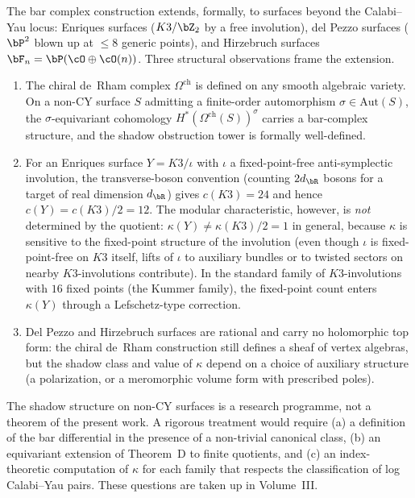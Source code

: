 \begin{remark}
\label{rem:enriques-exotic-shadows}
The bar complex
construction extends, formally, to surfaces beyond the
Calabi--Yau locus: Enriques surfaces ($K3/\bZ_2$ by a
free involution), del Pezzo surfaces ($\bP^2$ blown up at
$\leq 8$ generic points), and Hirzebruch surfaces
$\bF_n = \bP(\cO \oplus \cO(n))$. Three structural
observations frame the extension.
\begin{enumerate}[label=\textup{(\roman*)}]
\item The chiral de~Rham complex $\Omega^{\mathrm{ch}}$
 is defined on any smooth algebraic variety. On a non-CY
 surface $S$ admitting a finite-order automorphism
 $\sigma \in \mathrm{Aut}(S)$, the $\sigma$-equivariant
 cohomology $H^*(\Omega^{\mathrm{ch}}(S))^\sigma$ carries
 a bar-complex structure, and the shadow obstruction
 tower is formally well-defined.
\item For an Enriques surface $Y = K3/\iota$ with $\iota$ a
 fixed-point-free anti-symplectic involution, the
 transverse-boson convention (counting $2d_\bR$ bosons for
 a target of real dimension $d_\bR$) gives
 $c(K3) = 24$ and hence $c(Y) = c(K3)/2 = 12$. The
 modular characteristic, however, is \emph{not}
 determined by the quotient: $\kappa(Y) \neq \kappa(K3)/2 = 1$
 in general, because $\kappa$ is sensitive to the
 fixed-point structure of the involution
 (even though $\iota$ is fixed-point-free on $K3$ itself,
 lifts of $\iota$ to auxiliary bundles or to twisted
 sectors on nearby $K3$-involutions contribute). In the
 standard family of $K3$-involutions with $16$ fixed
 points (the Kummer family), the fixed-point count enters
 $\kappa(Y)$ through a Lefschetz-type correction.
\item Del Pezzo and Hirzebruch surfaces are rational and
 carry no holomorphic top form: the chiral de~Rham
 construction still defines a sheaf of vertex algebras,
 but the shadow class and value of $\kappa$ depend on a
 choice of auxiliary structure (a polarization,
 or a meromorphic volume form with prescribed poles).
\end{enumerate}
The shadow structure on non-CY surfaces is a research
programme, not a theorem of the present work. A rigorous
treatment would require (a) a definition of the bar
differential in the presence of a non-trivial canonical
class, (b) an equivariant extension of Theorem~D to finite
quotients, and (c) an index-theoretic computation of
$\kappa$ for each family that respects the classification
of log Calabi--Yau pairs. These questions are taken up
in Volume~III.
\end{remark}

